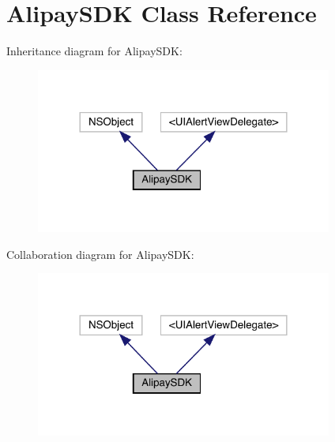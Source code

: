 \hypertarget{interface_alipay_s_d_k}{}\section{Alipay\+S\+DK Class Reference}
\label{interface_alipay_s_d_k}


Inheritance diagram for Alipay\+S\+DK\+:\nopagebreak
\begin{figure}[H]
\begin{center}
\leavevmode
\includegraphics[width=276pt]{interface_alipay_s_d_k__inherit__graph}
\end{center}
\end{figure}


Collaboration diagram for Alipay\+S\+DK\+:\nopagebreak
\begin{figure}[H]
\begin{center}
\leavevmode
\includegraphics[width=276pt]{interface_alipay_s_d_k__coll__graph}
\end{center}
\end{figure}
